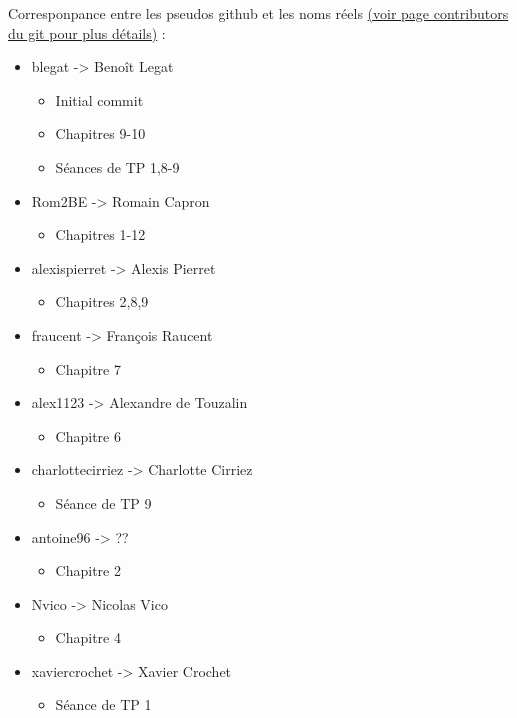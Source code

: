 Corresponpance entre les pseudos github et les noms réels \href{https://github.com/blegat/LINMA1691/graphs/contributors}{(voir page contributors du git pour plus détails)} :
\begin{itemize}
  \item blegat -> Benoît Legat
    \begin{itemize}
      \item Initial commit
      \item Chapitres 9-10
      \item Séances de TP 1,8-9
    \end{itemize}
  \item Rom2BE -> Romain Capron
    \begin{itemize}
      \item Chapitres 1-12
    \end{itemize}
  \item alexispierret -> Alexis Pierret
    \begin{itemize}
      \item Chapitres 2,8,9
    \end{itemize}
  \item fraucent -> François Raucent
    \begin{itemize}
      \item Chapitre 7
    \end{itemize}
  \item alex1123 -> Alexandre de Touzalin
    \begin{itemize}
      \item Chapitre 6
    \end{itemize}
  \item charlottecirriez -> Charlotte Cirriez
    \begin{itemize}
      \item Séance de TP 9
    \end{itemize}
  \item antoine96 -> ??
    \begin{itemize}
      \item Chapitre 2
    \end{itemize}
  \item Nvico -> Nicolas Vico
    \begin{itemize}
      \item Chapitre 4
    \end{itemize}
  \item xaviercrochet -> Xavier Crochet
    \begin{itemize}
      \item Séance de TP 1

\end{itemize}
\end{itemize}

